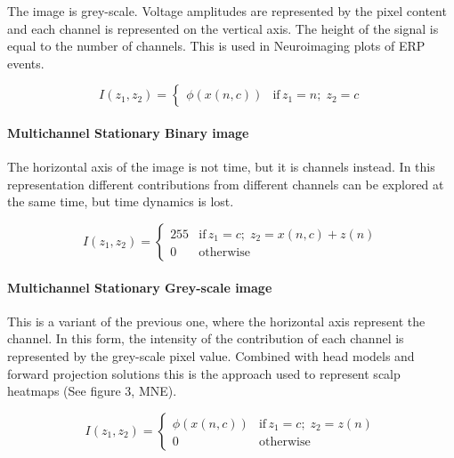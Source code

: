 The image is grey-scale. Voltage amplitudes are represented by the pixel content and each channel is represented on the vertical axis.  The height of the signal is equal to the number of channels.   This is used in Neuroimaging plots of ERP events.

\begin{equation}
I(z_1,z_2) = \left\{ \begin{array}{rl} \phi(x(n,c))  & \text{if} \,  z_1 = n; \; z_2 = c \end{array}\right.
\label{eq:images}
\end{equation}


\paragraph{Multichannel Stationary Binary image}

The horizontal axis of the image is not time, but it is channels instead.   In this representation different contributions from different channels can be explored at the same time, but time dynamics is lost.  

\begin{equation}
I(z_1,z_2) = \left\{ \begin{array}{rl}
255 & \text{if} \,  z_1 = c; \; z_2 =  x(n,c) + z(n) \\
0   & \mbox{otherwise}
\end{array}\right.
\label{eq:images}
\end{equation}

\paragraph{Multichannel Stationary Grey-scale image}

This is a variant of the previous one, where the horizontal axis represent the channel.   In this form, the intensity of the contribution of each channel is represented by the grey-scale pixel value.  Combined with head models and forward projection solutions this is the approach used to represent scalp heatmaps (See figure 3, MNE).

\begin{equation}
I(z_1,z_2) = \left\{ \begin{array}{rl}
\phi(x(n,c)) & \text{if} \,  z_1 = c; \; z_2 =  z(n) \\
0   & \mbox{otherwise}
\end{array}\right.
\label{eq:images}
\end{equation}


